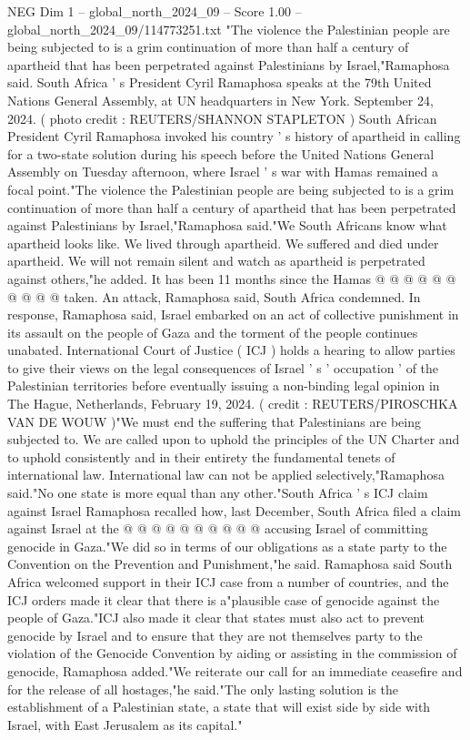\begin{textsample}{NEG Dim 1 – global\_north\_2024\_09 – Score 1.00 – global\_north\_2024\_09/114773251.txt}  \label{ex:f1_neg_364}
"The violence the Palestinian people are being subjected to is a grim continuation of more than half a century of apartheid that has been perpetrated against Palestinians by Israel,"Ramaphosa said.
South Africa ' s President Cyril Ramaphosa speaks at the 79th United Nations General Assembly, at UN headquarters in New York.
September 24, 2024. ( photo credit : REUTERS/SHANNON STAPLETON ) South African President Cyril Ramaphosa invoked his country ' s history of apartheid in calling for a two-state solution during his speech before the United Nations General Assembly on Tuesday afternoon, where Israel ' s war with Hamas remained a focal point."The violence the Palestinian people are being subjected to is a grim continuation of more than half a century of apartheid that has been perpetrated against Palestinians by Israel,"Ramaphosa said."We South Africans know what apartheid looks like.
We lived through apartheid.
We suffered and died under apartheid.
We will not remain silent and watch as apartheid is perpetrated against others,"he added.
It has been 11 months since the Hamas @ @ @ @ @ @ @ @ @ @ taken.
An attack, Ramaphosa said, South Africa condemned.
In response, Ramaphosa said, Israel embarked on an act of collective punishment in its assault on the people of Gaza and the torment of the people continues unabated.
International Court of Justice ( ICJ ) holds a hearing to allow parties to give their views on the legal consequences of Israel ' s ' occupation ' of the Palestinian territories before eventually issuing a non-binding legal opinion in The Hague, Netherlands, February 19, 2024. ( credit : REUTERS/PIROSCHKA VAN DE WOUW )"We must end the suffering that Palestinians are being subjected to.
We are called upon to uphold the principles of the UN Charter and to uphold consistently and in their entirety the fundamental tenets of international law.
International law can not be applied selectively,"Ramaphosa said."No one state is more equal than any other."South Africa ' s ICJ claim against Israel Ramaphosa recalled how, last December, South Africa filed a claim against Israel at the @ @ @ @ @ @ @ @ @ @ accusing Israel of committing genocide in Gaza."We did so in terms of our obligations as a state party to the Convention on the Prevention and Punishment,"he said.
Ramaphosa said South Africa welcomed support in their ICJ case from a number of countries, and the ICJ orders made it clear that there is a"plausible case of genocide against the people of Gaza."ICJ also made it clear that states must also act to prevent genocide by Israel and to ensure that they are not themselves party to the violation of the Genocide Convention by aiding or assisting in the commission of genocide, Ramaphosa added."We reiterate our call for an immediate ceasefire and for the release of all hostages,"he said."The only lasting solution is the establishment of a Palestinian state, a state that will exist side by side with Israel, with East Jerusalem as its capital."

\end{textsample}

